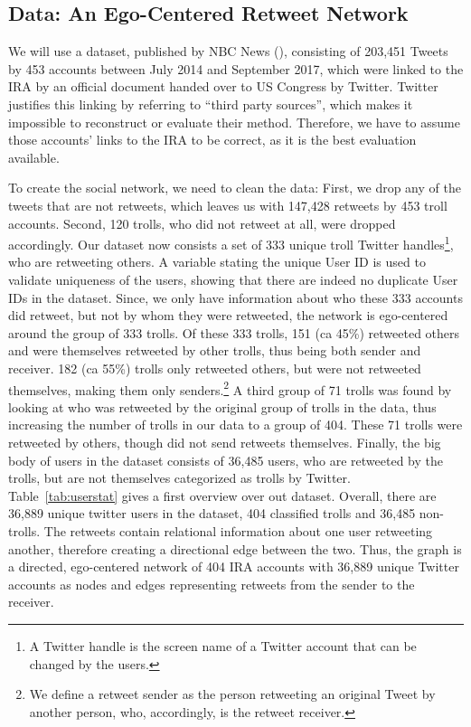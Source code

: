 \documentclass[12pt, titlepage=true, toc=bib]{scrartcl}
\begin{document}
\subsection{Data: An Ego-Centered Retweet Network}

We will use a dataset, published by NBC News (\cite*{popken_twitter_2018}), consisting of 203,451 Tweets by 453 accounts between July 2014 and September 2017, which were linked to the IRA by an official document handed over to US Congress by Twitter. Twitter justifies this linking by referring to ``third party sources'', which makes it impossible to reconstruct or evaluate their method. Therefore, we have to assume those accounts' links to the IRA to be correct, as it is the best evaluation available.

To create the social network, we need to clean the data: First, we drop any of the tweets that are not retweets, which leaves us with 147,428 retweets by 453 troll accounts. Second, 120 trolls, who did not retweet at all, were dropped accordingly. Our dataset now consists a set of 333 unique troll Twitter handles\footnote{A Twitter handle is the screen name of a Twitter account that can be changed by the users.}, who are retweeting others. A variable stating the unique User ID is used to validate uniqueness of the users, showing that there are indeed no duplicate User IDs in the dataset. Since, we only have information about who these 333 accounts did retweet, but not by whom they were retweeted, the network is ego-centered around the group of 333 trolls. Of these 333 trolls, 151 (ca 45\%) retweeted others and were themselves retweeted by other trolls, thus being both sender and receiver. 182 (ca 55\%) trolls only retweeted others, but were not retweeted themselves, making them only senders.\footnote{We define a retweet sender as the person retweeting an original Tweet by another person, who, accordingly, is the retweet receiver.} A third group of 71 trolls was found by looking at who was retweeted by the original group of trolls in the data, thus increasing the number of trolls in our data to a group of 404. These 71 trolls were retweeted by others, though did not send retweets themselves. Finally, the big body of users in the dataset consists of 36,485 users, who are retweeted by the trolls, but are not themselves categorized as trolls by Twitter. Table~\ref{tab:userstat} gives a first overview over out dataset. Overall, there are 36,889 unique twitter users in the dataset, 404 classified trolls and 36,485 non-trolls. The retweets contain relational information about one user retweeting another, therefore creating a directional edge between the two. Thus, the graph is a directed, ego-centered network of 404 IRA accounts with 36,889 unique Twitter accounts as nodes and edges representing retweets from the sender to the receiver.
\end{document}
